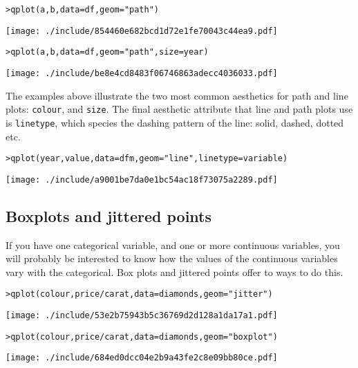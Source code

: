 \begin{alltt}
> qplot(a, b, data = df, geom = "path")
\end{alltt}
\texttt{[image: ./include/854460e682bcd1d72e1fe70043c44ea9.pdf]}
\begin{alltt}

> qplot(a, b, data = df, geom = "path", size = year)
\end{alltt}
\texttt{[image: ./include/be8e4cd8483f06746863adecc4036033.pdf]}
\begin{alltt}

\end{alltt}

The examples above illustrate the two most common aesthetics for path and line plots: {\tt colour}, and {\tt size}.  The final aesthetic attribute that line and path plots use is {\tt linetype}, which species the dashing pattern of the line: solid, dashed, dotted etc.

\begin{alltt}
> qplot(year, value, data = dfm, geom = "line", linetype = variable)
\end{alltt}
\texttt{[image: ./include/a9001be7da0e1bc54ac18f73075a2289.pdf]}
\begin{alltt}

\end{alltt}


\subsection{Boxplots and jittered points}\label{sub:boxplot}

If you have one categorical variable, and one or more continuous variables, you will probably be interested to know how the values of the continuous variables vary with the categorical.  Box plots and jittered points offer to ways to do this.  

\begin{alltt}
> qplot(colour, price/carat, data = diamonds, geom = "jitter")
\end{alltt}
\texttt{[image: ./include/53e2b75943b5c36769d2d128a1da17a1.pdf]}
\begin{alltt}

> qplot(colour, price/carat, data = diamonds, geom = "boxplot")
\end{alltt}
\texttt{[image: ./include/684ed0dcc04e2b9a43fe2c8e09bb80ce.pdf]}
\begin{alltt}

\end{alltt}

